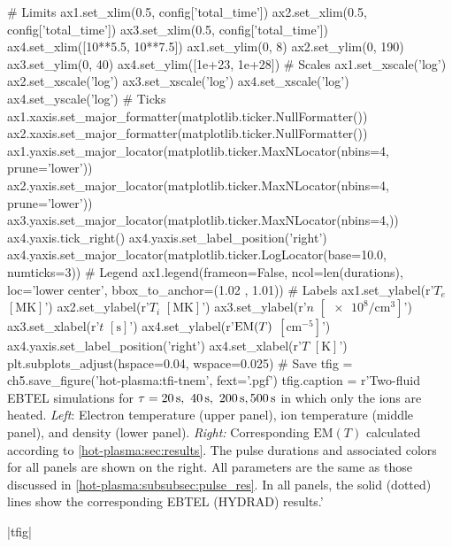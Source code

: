 \begin{pycode}[chapter5]
# Limits
ax1.set_xlim(0.5, config['total_time'])
ax2.set_xlim(0.5, config['total_time'])
ax3.set_xlim(0.5, config['total_time'])
ax4.set_xlim([10**5.5, 10**7.5])
ax1.set_ylim(0, 8)
ax2.set_ylim(0, 190)
ax3.set_ylim(0, 40)
ax4.set_ylim([1e+23, 1e+28])
# Scales
ax1.set_xscale('log')
ax2.set_xscale('log')
ax3.set_xscale('log')
ax4.set_xscale('log')
ax4.set_yscale('log')
# Ticks
ax1.xaxis.set_major_formatter(matplotlib.ticker.NullFormatter())
ax2.xaxis.set_major_formatter(matplotlib.ticker.NullFormatter())
ax1.yaxis.set_major_locator(matplotlib.ticker.MaxNLocator(nbins=4, prune='lower'))
ax2.yaxis.set_major_locator(matplotlib.ticker.MaxNLocator(nbins=4, prune='lower'))
ax3.yaxis.set_major_locator(matplotlib.ticker.MaxNLocator(nbins=4,))
ax4.yaxis.tick_right()
ax4.yaxis.set_label_position('right')
ax4.yaxis.set_major_locator(matplotlib.ticker.LogLocator(base=10.0, numticks=3))
# Legend
ax1.legend(frameon=False, ncol=len(durations), loc='lower center',
            bbox_to_anchor=(1.02 , 1.01))
# Labels
ax1.set_ylabel(r'$T_e$ $[\si{\mega\kelvin}]$')
ax2.set_ylabel(r'$T_i$ $[\si{\mega\kelvin}]$')
ax3.set_ylabel(r'$n$ $[\num{e8}\si{\per\cubic\cm}]$')
ax3.set_xlabel(r'$t$ $[\si{\second}]$')
ax4.set_ylabel(r'$\textup{EM}(T)$ $[\si{\cm\tothe{-5}}]$')
ax4.yaxis.set_label_position('right')
ax4.set_xlabel(r'$T$ $[\si{\kelvin}]$')
plt.subplots_adjust(hspace=0.04, wspace=0.025)
# Save
tfig = ch5.save_figure('hot-plasma:tfi-tnem', fext='.pgf')
tfig.caption = r'Two-fluid EBTEL simulations for $\tau=\SIlist[list-final-separator = {,}]{20;40;200;500}{\second}$ in which only the ions are heated. \textit{Left}: Electron temperature (upper panel), ion temperature (middle panel), and density (lower panel). \textit{Right:} Corresponding $\mathrm{EM}(T)$ calculated according to \autoref{hot-plasma:sec:results}. The pulse durations and associated colors for all panels are shown on the right. All parameters are the same as those discussed in \autoref{hot-plasma:subsubsec:pulse_res}. In all panels, the solid (dotted) lines show the corresponding EBTEL (HYDRAD) results.'
\end{pycode}
\py[chapter5]|tfig|

